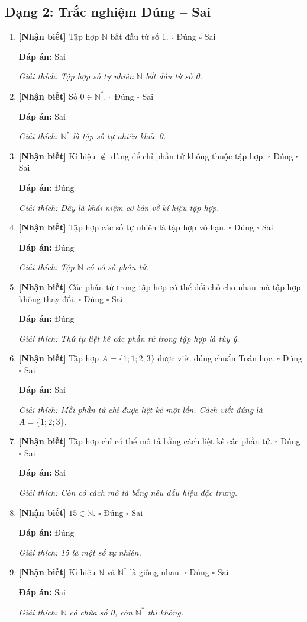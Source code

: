 \documentclass[12pt,a4paper]{article}
\newcommand{\nhanbiet}{\textcolor{nhanbiet}{\textbf{[Nhận biết]}}}
\newcommand{\dapan}[1]{\par\smallskip\textbf{Đáp án:} #1}
\newcommand{\giaithich}[1]{\par\textit{Giải thích: #1}}
\begin{document}
\subsection*{Dạng 2: Trắc nghiệm Đúng -- Sai}

\begin{enumerate}[label=\textbf{Câu \arabic*.},resume]
    \item \nhanbiet{} Tập hợp $\mathbb{N}$ bắt đầu từ số 1.
    \hfill $\square$ Đúng \quad $\square$ Sai
    \dapan{Sai}
    \giaithich{Tập hợp số tự nhiên $\mathbb{N}$ bắt đầu từ số 0.}

    \item \nhanbiet{} Số $0 \in \mathbb{N}^*$.
    \hfill $\square$ Đúng \quad $\square$ Sai
    \dapan{Sai}
    \giaithich{$\mathbb{N}^*$ là tập số tự nhiên khác 0.}

    \item \nhanbiet{} Kí hiệu $\notin$ dùng để chỉ phần tử không thuộc tập hợp.
    \hfill $\square$ Đúng \quad $\square$ Sai
    \dapan{Đúng}
    \giaithich{Đây là khái niệm cơ bản về kí hiệu tập hợp.}

    \item \nhanbiet{} Tập hợp các số tự nhiên là tập hợp vô hạn.
    \hfill $\square$ Đúng \quad $\square$ Sai
    \dapan{Đúng}
    \giaithich{Tập $\mathbb{N}$ có vô số phần tử.}

    \item \nhanbiet{} Các phần tử trong tập hợp có thể đổi chỗ cho nhau mà tập hợp không thay đổi.
    \hfill $\square$ Đúng \quad $\square$ Sai
    \dapan{Đúng}
    \giaithich{Thứ tự liệt kê các phần tử trong tập hợp là tùy ý.}

    \item \nhanbiet{} Tập hợp $A = \{1; 1; 2; 3\}$ được viết đúng chuẩn Toán học.
    \hfill $\square$ Đúng \quad $\square$ Sai
    \dapan{Sai}
    \giaithich{Mỗi phần tử chỉ được liệt kê một lần. Cách viết đúng là $A=\{1; 2; 3\}$.}

    \item \nhanbiet{} Tập hợp chỉ có thể mô tả bằng cách liệt kê các phần tử.
    \hfill $\square$ Đúng \quad $\square$ Sai
    \dapan{Sai}
    \giaithich{Còn có cách mô tả bằng nêu dấu hiệu đặc trưng.}

    \item \nhanbiet{} $15 \in \mathbb{N}$.
    \hfill $\square$ Đúng \quad $\square$ Sai
    \dapan{Đúng}
    \giaithich{15 là một số tự nhiên.}

    \item \nhanbiet{} Kí hiệu $\mathbb{N}$ và $\mathbb{N}^*$ là giống nhau.
    \hfill $\square$ Đúng \quad $\square$ Sai
    \dapan{Sai}
    \giaithich{$\mathbb{N}$ có chứa số 0, còn $\mathbb{N}^*$ thì không.}


\end{enumerate}
\end{document}
